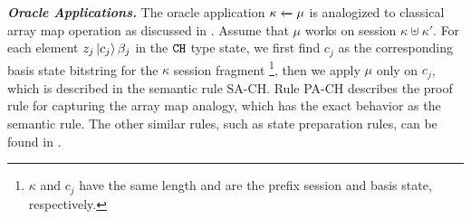 \noindent\textbf{\textit{Oracle Applications.}}\label{sec:oracle-state}
The oracle application ${\kappa} \xleftarrow{} {\mu}$ is analogized to classical array map operation as discussed in . Assume that $\mu$ works on session $\kappa\uplus \kappa'$. For each element $z_j\left\vert{c_{j}}\right\rangle{\beta_j}$ in the $\texttt{CH}$ type state, we first find $c_{j}$ as the corresponding basis state bitstring for the $\kappa$ session fragment \footnote{ $\kappa$ and $c_{j}$ have the same length and are the prefix session and basis state, respectively.}, then we apply $\mu$ only on $c_{j}$, which is described in the semantic rule \textsc{SA-CH}. Rule \textsc{PA-CH} describes the proof rule for capturing the array map analogy, which has the exact behavior as the semantic rule.
The other similar rules, such as state preparation rules, can be found in . 

